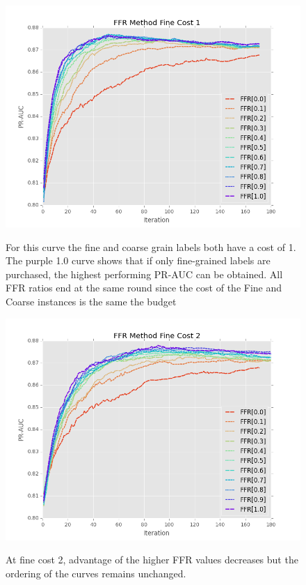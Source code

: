 \documentclass[ms]{nuthesis}
\begin{document}
\FloatBarrier
\begin{figure}[!htb]
	\centering
    \includegraphics[width=1.0\columnwidth]{fig/ParamsFFR_PR_Cost1_rnds0_180}
    \label{fig:ParamsFFR_PR_Cost1_rnds0_180}
    \caption{For this curve the fine and coarse grain labels
    both have a cost of 1. The purple 1.0 curve shows that if only fine-grained labels
    are purchased, the highest performing PR-AUC can be obtained. All FFR ratios end at the same round
    since the cost of the Fine and Coarse instances is the same the budget}
\end{figure}
\FloatBarrier


\FloatBarrier
\begin{figure}[!htb]
	\centering
    \includegraphics[width=1.0\columnwidth]{fig/ParamsFFR_PR_Cost2_rnds0_180}
    \label{fig:ParamsFFR_PR_Cost2_rnds0_180}
    \caption{At fine cost 2, advantage of the higher FFR values decreases but the ordering
    of the curves remains unchanged.}
\end{figure}
\FloatBarrier
\end{document}

